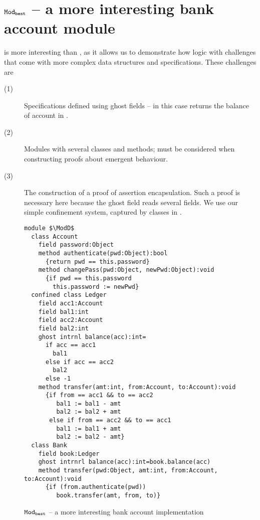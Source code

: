 \section{ ${\texttt{Mod}}_{{\texttt{best}}}$  -- a more interesting bank account module}

\label{app:BankAccount}

\ModD  is more interesting than \ModC, as it allows us  to demonstrate how   \Nec logic 
 with  challenges that come with more complex data structures and specifications.
These challenges are 
\begin{description}
\item[(1)] Specifications defined using ghost fields -- in this case  returns the balance of account  in  .
\item[(2)] Modules with several    classes and methods;  must be considered when constructing proofs about emergent behaviour.
\item[(3)]  The construction of a proof of assertion encapsulation. Such a proof is necessary  here because
 the ghost field  reads several  fields. We use our 
 simple confinement system,  captured by \enclosed classes in \Loo.
\end{description}


\begin{figure}[h]
\begin{lstlisting}[mathescape=true, frame=lines]
module $\ModD$
  class Account
    field password:Object
    method authenticate(pwd:Object):bool
      {return pwd == this.password}
    method changePass(pwd:Object, newPwd:Object):void
      {if pwd == this.password
        this.password := newPwd}
  confined class Ledger
    field acc1:Account
    field bal1:int
    field acc2:Account
    field bal2:int
    ghost intrnl balance(acc):int=
      if acc == acc1
        bal1
      else if acc == acc2
        bal2
      else -1
    method transfer(amt:int, from:Account, to:Account):void
      {if from == acc1 && to == acc2
         bal1 := bal1 - amt
         bal2 := bal2 + amt
       else if from == acc2 && to == acc1
         bal1 := bal1 + amt
         bal2 := bal2 - amt}
  class Bank
    field book:Ledger
    ghost intrnrl balance(acc):int=book.balance(acc)
    method transfer(pwd:Object, amt:int, from:Account, to:Account):void
      {if (from.authenticate(pwd))
         book.transfer(amt, from, to)}
\end{lstlisting}
\caption{${\texttt{Mod}}_{{\texttt{best}}}$ -- a more interesting bank account implementation}
\label{f:ex-bank-short}
\end{figure}
 
